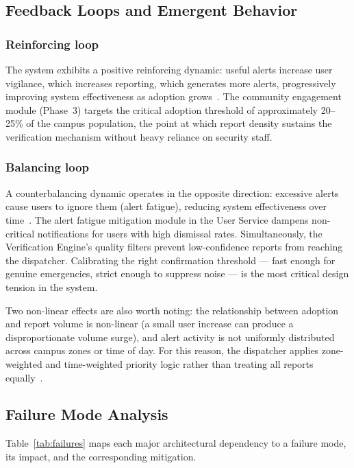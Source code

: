 \documentclass[10pt,twocolumn]{article}
\begin{document}
\subsection{Feedback Loops and Emergent Behavior}

\subsubsection{Reinforcing loop}
The system exhibits a positive reinforcing dynamic: useful alerts
increase user vigilance, which increases reporting, which generates more
alerts, progressively improving system effectiveness as adoption
grows~\cite{meadows2008}. The community engagement module (Phase~3)
targets the critical adoption threshold of approximately 20--25\% of the
campus population, the point at which report density sustains the
verification mechanism without heavy reliance on security staff.

\subsubsection{Balancing loop}
A counterbalancing dynamic operates in the opposite direction: excessive
alerts cause users to ignore them (alert fatigue), reducing system
effectiveness over time~\cite{meadows2008}. The alert fatigue mitigation
module in the User Service dampens non-critical notifications for users
with high dismissal rates. Simultaneously, the Verification Engine's
quality filters prevent low-confidence reports from reaching the
dispatcher. Calibrating the right confirmation threshold --- fast enough
for genuine emergencies, strict enough to suppress noise --- is the most
critical design tension in the system.

Two non-linear effects are also worth noting: the relationship between
adoption and report volume is non-linear (a small user increase can
produce a disproportionate volume surge), and alert activity is not
uniformly distributed across campus zones or time of day. For this
reason, the dispatcher applies zone-weighted and time-weighted priority
logic rather than treating all reports equally~\cite{checkland1981}.

\subsection{Failure Mode Analysis}

Table~\ref{tab:failures} maps each major architectural dependency to a
failure mode, its impact, and the corresponding mitigation.
\end{document}
